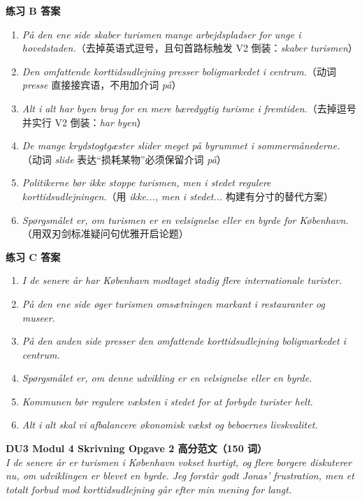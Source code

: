 \begin{answerbox}
\textbf{练习 B 答案}
\begin{enumerate}
  \item \textit{På den ene side skaber turismen mange arbejdspladser for unge i hovedstaden.}（去掉英语式逗号，且句首路标触发 V2 倒装：\textit{skaber turismen}）
  \item \textit{Den omfattende korttidsudlejning presser boligmarkedet i centrum.}（动词 \textit{presse} 直接接宾语，不用加介词 \textit{på}）
  \item \textit{Alt i alt har byen brug for en mere bæredygtig turisme i fremtiden.}（去掉逗号并实行 V2 倒装：\textit{har byen}）
  \item \textit{De mange krydstogtgæster slider meget på byrummet i sommermånederne.}（动词 \textit{slide} 表达“损耗某物”必须保留介词 \textit{på}）
  \item \textit{Politikerne bør ikke stoppe turismen, men i stedet regulere korttidsudlejningen.}（用 \textit{ikke..., men i stedet...} 构建有分寸的替代方案）
  \item \textit{Spørgsmålet er, om turismen er en velsignelse eller en byrde for København.}（用双刃剑标准疑问句优雅开启论题）
\end{enumerate}

\textbf{练习 C 答案}
\begin{enumerate}
  \item \textit{I de senere år har København modtaget stadig flere internationale turister.}
  \item \textit{På den ene side øger turismen omsætningen markant i restauranter og museer.}
  \item \textit{På den anden side presser den omfattende korttidsudlejning boligmarkedet i centrum.}
  \item \textit{Spørgsmålet er, om denne udvikling er en velsignelse eller en byrde.}
  \item \textit{Kommunen bør regulere væksten i stedet for at forbyde turister helt.}
  \item \textit{Alt i alt skal vi afbalancere økonomisk vækst og beboernes livskvalitet.}
\end{enumerate}

\textbf{DU3 Modul 4 Skrivning Opgave 2 高分范文（150 词）}\\
\textit{I de senere år er turismen i København vokset hurtigt, og flere borgere diskuterer nu, om udviklingen er blevet en byrde. Jeg forstår godt Jonas' frustration, men et totalt forbud mod korttidsudlejning går efter min mening for langt.}


\end{answerbox}
